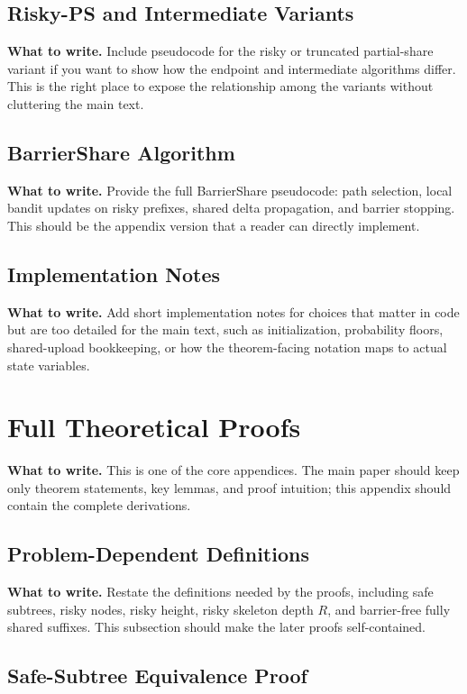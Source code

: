 \documentclass{article}
\newcommand{\towrite}[1]{\noindent\textbf{What to write.} #1}
\begin{document}
\subsection{Risky-PS and Intermediate Variants}

\towrite{Include pseudocode for the risky or truncated partial-share variant if you want to show how the endpoint and intermediate algorithms differ. This is the right place to expose the relationship among the variants without cluttering the main text.}

\subsection{BarrierShare Algorithm}

\towrite{Provide the full BarrierShare pseudocode: path selection, local bandit updates on risky prefixes, shared delta propagation, and barrier stopping. This should be the appendix version that a reader can directly implement.}

\subsection{Implementation Notes}

\towrite{Add short implementation notes for choices that matter in code but are too detailed for the main text, such as initialization, probability floors, shared-upload bookkeeping, or how the theorem-facing notation maps to actual state variables.}

\section{Full Theoretical Proofs}

\towrite{This is one of the core appendices. The main paper should keep only theorem statements, key lemmas, and proof intuition; this appendix should contain the complete derivations.}

\subsection{Problem-Dependent Definitions}

\towrite{Restate the definitions needed by the proofs, including safe subtrees, risky nodes, risky height, risky skeleton depth $R$, and barrier-free fully shared suffixes. This subsection should make the later proofs self-contained.}

\subsection{Safe-Subtree Equivalence Proof}
\end{document}
